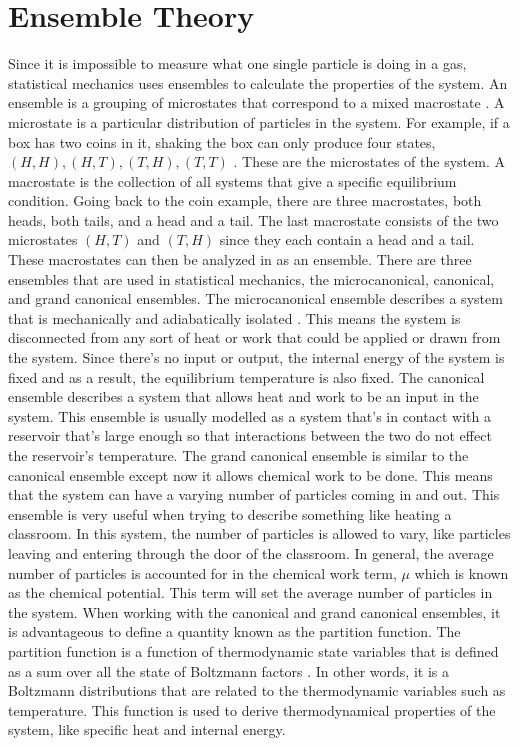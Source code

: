 \section{Ensemble Theory}
Since it is impossible to measure what one single particle is doing in a gas, statistical mechanics uses ensembles to calculate the properties of the system. An ensemble is a grouping of microstates that correspond to a mixed macrostate \cite{Kardar}. A microstate is a particular distribution of particles in the system. For example, if a box has two coins in it, shaking the box can only produce four states, $(H,H),(H,T),(T,H),(T,T)$ \cite{Blundell}. These are the microstates of the system. A macrostate is the collection of all systems that give a specific equilibrium condition. Going back to the coin example, there are three macrostates, both heads, both tails, and a head and a tail. The last macrostate consists of the two microstates $(H,T)$ and $(T,H)$ since they each contain a head and a tail. These macrostates can then be analyzed in as an ensemble. There are three ensembles that are used in statistical mechanics, the microcanonical, canonical, and grand canonical ensembles. The microcanonical ensemble describes a system that is mechanically and adiabatically isolated \cite{Kardar}. This means the system is disconnected from any sort of heat or work that could be applied or drawn from the system. Since there's no input or output, the internal energy of the system is fixed and as a result, the equilibrium temperature is also fixed. 
The canonical ensemble describes a system that allows heat and work to be an input in the system. This ensemble is usually modelled as a system that's in contact with a reservoir that's large enough so that interactions between the two do not effect the reservoir's temperature. 
The grand canonical ensemble is similar to the canonical ensemble except now it allows chemical work to be done. This means that the system can have a varying number of particles coming in and out. This ensemble is very useful when trying to describe something like heating a classroom. In this system, the number of particles is allowed to vary, like particles leaving and entering through the door of the classroom. In general, the average number of particles is accounted for in the chemical work term, $\mu$ which is known as the chemical potential. This term will set the average number of particles in the system. 
When working with the canonical and grand canonical ensembles, it is advantageous to define a quantity known as the partition function. The partition function is a function of thermodynamic state variables that is defined as a sum over all the state of Boltzmann factors \cite{Blundell}. In other words, it is a Boltzmann distributions that are related to the thermodynamic variables such as temperature. This function is used to derive thermodynamical properties of the system, like specific heat and internal energy.
